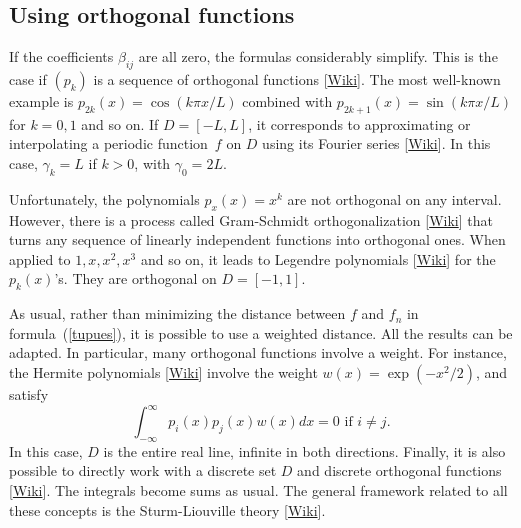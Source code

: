 \documentclass[oneside,10pt]{book}
\begin{document}
\subsection{Using orthogonal functions}\label{poreese}

If the coefficients $\beta_{ij}$ are all zero, the formulas considerably simplify. This is the case if $(p_k)$ is
 a sequence of \textcolor{index}{orthogonal functions} [\href{https://en.wikipedia.org/wiki/Orthogonal_functions}{Wiki}].   The most well-known example is $p_{2k}(x) = \cos(k\pi x/L)$ combined
 with $p_{2k+1}(x) = \sin(k\pi x/L)$ for $k=0,1$ and so on. If $D=[-L,L]$, it corresponds to approximating or interpolating a periodic function~$f$ on $D$ using its  \textcolor{index}{Fourier series} [\href{https://en.wikipedia.org/wiki/Fourier_series}{Wiki}]. In this case, $\gamma_k = L$ if $k>0$, with $\gamma_0=2L$.

Unfortunately, the polynomials $p_x(x) = x^k$ are not orthogonal on any interval.  However, there is a process called
\textcolor{index}{Gram-Schmidt orthogonalization}
[\href{https://en.wikipedia.org/wiki/Gram\%E2\%80\%93Schmidt_process}{Wiki}]
 that turns any sequence of linearly independent functions into orthogonal ones. When applied to $1, x, x^2, x^3$ and so on, it leads to
\textcolor{index}{Legendre polynomials} [\href{https://en.wikipedia.org/wiki/Legendre_polynomials}{Wiki}] for the $p_k(x)$'s. They are orthogonal on $D = [-1, 1]$.

As usual, rather than minimizing the distance between $f$ and $f_n$ in formula~(\ref{tupues}), it is possible to use a weighted distance. All the results can be adapted. In particular, many orthogonal functions involve a weight. For instance,
the \textcolor{index}{Hermite polynomials} [\href{https://en.wikipedia.org/wiki/Hermite_polynomials}{Wiki}] involve the weight $w(x)=\exp(-x^2/2)$, and satisfy
$$
\int_{-\infty}^\infty p_i(x)p_j(x)w(x) dx = 0 \text { if } i\neq j.
 $$
In this case, $D$ is the entire real line, infinite in both directions. Finally, it is also possible to directly work with a discrete set $D$
 and
\textcolor{index}{discrete orthogonal functions} [\href{https://en.wikipedia.org/wiki/Discrete_orthogonal_polynomials}{Wiki}].
The integrals become sums as usual. The general framework related to all these concepts
 is the \textcolor{index}{Sturm-Liouville theory} [\href{https://en.wikipedia.org/wiki/Sturm\%E2\%80\%93Liouville_theory}{Wiki}].
\end{document}
